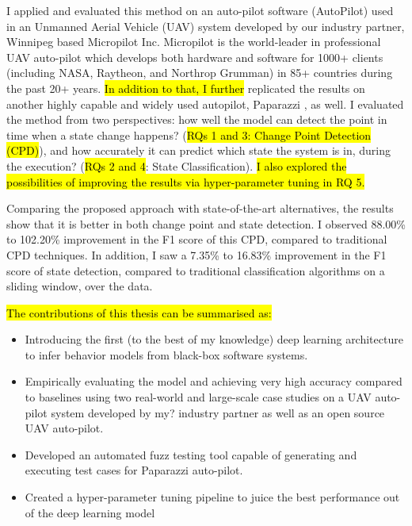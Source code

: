 

I applied and evaluated this method on an auto-pilot software (AutoPilot) used in an Unmanned Aerial Vehicle (UAV) system developed by our industry partner, Winnipeg based Micropilot Inc. Micropilot is the world-leader in professional UAV auto-pilot which develops both hardware and software for 1000+ clients (including NASA, Raytheon, and Northrop Grumman) in 85+ countries during the past 20+ years. \hl{In addition to that, I further} replicated the results on another highly capable and widely used autopilot, Paparazzi \cite{hattenberger2014using}, as well.
I evaluated the method from two perspectives: how well the model can detect the point in time when a state change happens? (\hl{RQs 1 and 3: Change Point Detection (CPD)}), and how accurately it can predict which state the system is in, during the execution? (\hl{RQs 2 and 4}: State Classification). \hl{I also explored the possibilities of improving the results via hyper-parameter tuning in RQ 5.}



Comparing the proposed approach with state-of-the-art alternatives, the results show that it is better in both change point and state detection. I observed 88.00\% to 102.20\% improvement in the F1 score of this CPD, compared to traditional CPD techniques. In addition, I saw a 7.35\% to 16.83\% improvement in the F1 score of state detection, compared to traditional classification algorithms on a sliding window, over the data.


\hl{The contributions of this thesis can be summarised as:}
\begin{itemize}
    \item Introducing the first (to the best of my knowledge) deep learning architecture to infer behavior models from black-box software systems.
    \item Empirically evaluating the model and achieving very high accuracy compared to baselines using two real-world and large-scale case studies on a UAV auto-pilot system developed by my? industry partner as well as an open source UAV auto-pilot.
    \item Developed an automated fuzz testing tool capable of generating and executing test cases for Paparazzi auto-pilot.
    \item Created a hyper-parameter tuning pipeline to juice the best performance out of the deep learning model
\end{itemize}

